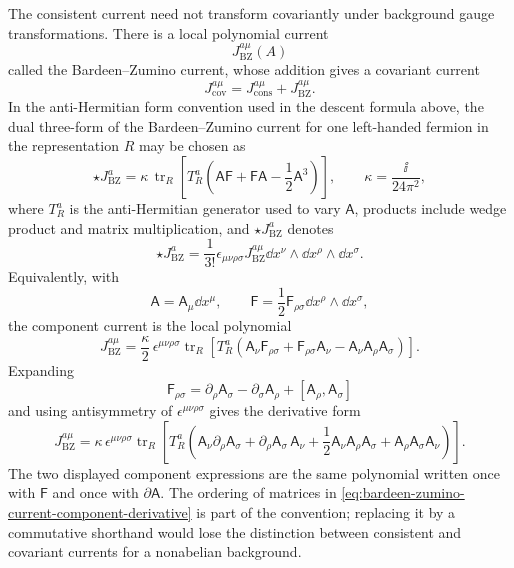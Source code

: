 The consistent current need not transform covariantly under background gauge
transformations.  There is a local polynomial current
\[
  J_{\mathrm{BZ}}^{a\mu}(A)
\]
called the Bardeen--Zumino current, whose addition gives a covariant current
\[
  J_{\mathrm{cov}}^{a\mu}
  =
  J_{\mathrm{cons}}^{a\mu}+J_{\mathrm{BZ}}^{a\mu}.
\]
In the anti-Hermitian form convention used in the descent formula above, the
dual three-form of the Bardeen--Zumino current for one left-handed fermion in
the representation \(R\) may be chosen as
\begin{equation}
  \star J_{\mathrm{BZ}}^a
  =
  \kappa\,
  \operatorname{tr}_R
  \left[
    T_R^a
    \left(
      \mathsf A\mathsf F+\mathsf F\mathsf A
      -\frac12\mathsf A^3
    \right)
  \right],
  \qquad
  \kappa=\frac{\ii}{24\pi^2},
  \label{eq:bardeen-zumino-current-polynomial}
\end{equation}
where \(T_R^a\) is the anti-Hermitian generator used to vary
\(\mathsf A\), products include wedge product and matrix multiplication, and
\(\star J_{\mathrm{BZ}}^a\) denotes
\[
  \star J_{\mathrm{BZ}}^a
  =
  \frac1{3!}
  \epsilon_{\mu\nu\rho\sigma}
  J_{\mathrm{BZ}}^{a\mu}
  \dd x^\nu\wedge\dd x^\rho\wedge\dd x^\sigma .
\]
Equivalently, with
\[
  \mathsf A=\mathsf A_\mu\dd x^\mu,\qquad
  \mathsf F=\frac12\mathsf F_{\rho\sigma}\dd x^\rho\wedge\dd x^\sigma,
\]
the component current is the local polynomial
\begin{equation}
  J_{\mathrm{BZ}}^{a\mu}
  =
  \frac{\kappa}{2}\,
  \epsilon^{\mu\nu\rho\sigma}
  \operatorname{tr}_R
  \left[
    T_R^a
    \left(
      \mathsf A_\nu\mathsf F_{\rho\sigma}
      +
      \mathsf F_{\rho\sigma}\mathsf A_\nu
      -
      \mathsf A_\nu\mathsf A_\rho\mathsf A_\sigma
    \right)
  \right].
  \label{eq:bardeen-zumino-current-component-curvature}
\end{equation}
Expanding
\[
  \mathsf F_{\rho\sigma}
  =
  \partial_\rho\mathsf A_\sigma
  -
  \partial_\sigma\mathsf A_\rho
  +
  [\mathsf A_\rho,\mathsf A_\sigma]
\]
and using antisymmetry of
\(\epsilon^{\mu\nu\rho\sigma}\) gives the derivative form
\begin{equation}
  J_{\mathrm{BZ}}^{a\mu}
  =
  \kappa\,\epsilon^{\mu\nu\rho\sigma}
  \operatorname{tr}_R
  \left[
    T_R^a
    \left(
      \mathsf A_\nu\partial_\rho\mathsf A_\sigma
      +
      \partial_\rho\mathsf A_\sigma\,\mathsf A_\nu
      +
      \frac12\mathsf A_\nu\mathsf A_\rho\mathsf A_\sigma
      +
      \mathsf A_\rho\mathsf A_\sigma\mathsf A_\nu
    \right)
  \right].
  \label{eq:bardeen-zumino-current-component-derivative}
\end{equation}
The two displayed component expressions are the same polynomial written once
with \(\mathsf F\) and once with \(\partial\mathsf A\).  The ordering of
matrices in \eqref{eq:bardeen-zumino-current-component-derivative} is part of
the convention; replacing it by a commutative shorthand would lose the
distinction between consistent and covariant currents for a nonabelian
background.

